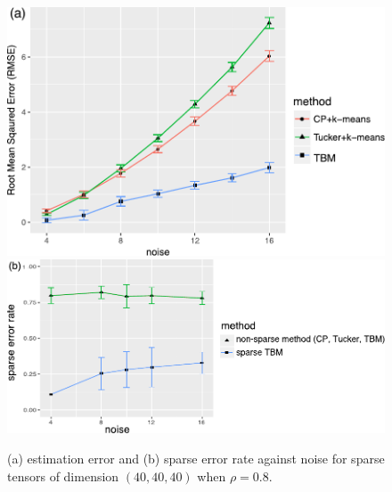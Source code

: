 \documentclass{article}
\begin{document}
\begin{appendices}
		



\begin{figure}[http!]
\begin{center}
\includegraphics[width=.38\textwidth]{figures/clustering_404040_sparse}
\includegraphics[width=.55\textwidth]{figures/clustering_correct_sparse}
\end{center}
\caption{(a) estimation error and (b) sparse error rate against noise for sparse tensors of dimension $(40,40,40)$ when $\rho=0.8$. }\label{fig:sparse}
\end{figure}


\begin{table}[http]


	\centering	


\end{table}
\end{appendices}
\end{document}
